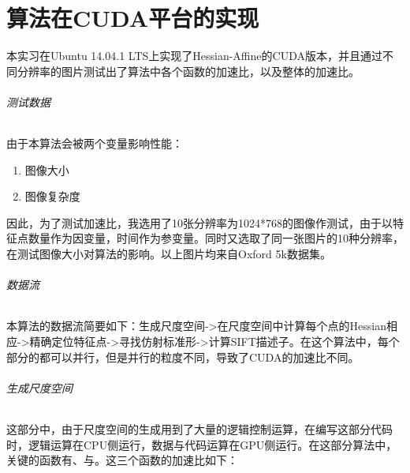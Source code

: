 
\chapter{算法在CUDA平台的实现}
  本实习在Ubuntu 14.04.1 LTS上实现了Hessian-Affine的CUDA版本，并且通过不同分辨率的图片测试出了算法中各个函数的加速比，以及整体的加速比。
  \subparagraph{测试数据}
    由于本算法会被两个变量影响性能：
    \begin{enumerate}
      \item 图像大小
      \item 图像复杂度
    \end{enumerate}
    \par
    因此，为了测试加速比，我选用了10张分辨率为1024*768的图像作测试，由于以特征点数量作为因变量，时间作为参变量。同时又选取了同一张图片的10种分辨率，在测试图像大小对算法的影响。以上图片均来自Oxford 5k数据集。
  \subparagraph{数据流}
    本算法的数据流简要如下：生成尺度空间->在尺度空间中计算每个点的Hessian相应->精确定位特征点->寻找仿射标准形->计算SIFT描述子。在这个算法中，每个部分的都可以并行，但是并行的粒度不同，导致了CUDA的加速比不同。
  \subparagraph{生成尺度空间}
    这部分中，由于尺度空间的生成用到了大量的逻辑控制运算，在编写这部分代码时，逻辑运算在CPU侧运行，数据与代码运算在GPU侧运行。在这部分算法中，关键的函数有、与。这三个函数的加速比如下：


